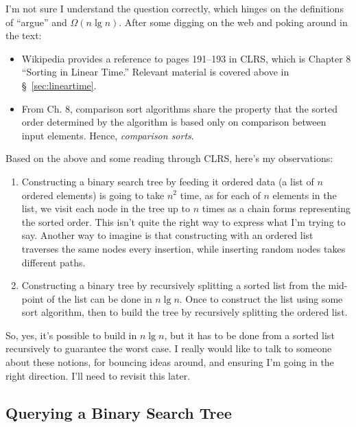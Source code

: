 \documentclass{article}
\begin{document}
I'm not sure I understand the question correctly, which hinges on the
definitions of ``argue'' and $\Omega(n\lg n)$. After some digging on the
web and poking around in the text:

\begin{itemize}

  \item Wikipedia provides a reference to pages 191--193 in CLRS, which is Chapter 8
``Sorting in Linear Time.'' Relevant material is covered above in
\S~\ref{sec:lineartime}.

\item From Ch. 8, comparison sort algorithms share the property that
  the sorted order determined by the algorithm is based only on
  comparison between input elements. Hence, \emph{comparison sorts}.

\end{itemize}

Based on the above and some reading through CLRS, here's my observations:

\begin{enumerate}
  \item Constructing a binary search tree by feeding it ordered data (a list
    of $n$ ordered elements) is going to take $n^2$ time, as for each of $n$
    elements in the list, we visit each node in the tree up to $n$ times as
    a chain forms representing the sorted order. This isn't quite the right
    way to express what I'm trying to say. Another way to imagine is that
    constructing with an ordered list traverses the same nodes every insertion,
    while inserting random nodes takes different paths.
  \item Constructing a binary tree by recursively splitting a sorted list
    from the mid-point of the list can be done in $n\lg n$. Once to construct
    the list using some sort algorithm, then to build the tree by recursively
    splitting the ordered list.
\end{enumerate}

So, yes, it's possible to build in $n\lg n$, but it has to be done from a
sorted list recursively to guarantee the worst case. I really would like
to talk to someone about these notions, for bouncing ideas around, and
ensuring I'm going in the right direction. I'll need to revisit this later.


\subsection{Querying a Binary Search Tree}
\end{document}
